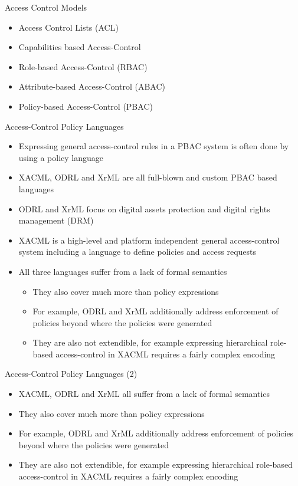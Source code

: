 \documentclass{beamer}
\begin{document}
\begin{frame}{Access Control Models}
\LARGE
\begin{itemize}
   \item Access Control Lists (ACL)
   \item Capabilities based Access-Control 
   \item Role-based Access-Control (RBAC)
   \item Attribute-based Access-Control (ABAC)
   \item Policy-based Access-Control (PBAC)
\end{itemize}
\end{frame}

\begin{frame}{Access-Control Policy Languages}
\begin{itemize}
   \item Expressing general access-control rules in a PBAC system is often done by using a policy language
   \item XACML, ODRL and XrML are all full-blown and custom PBAC based languages 
   \item ODRL and XrML focus on digital assets protection and digital rights management (DRM)
   \item XACML is a high-level and platform independent general access-control system including a language to define policies and access requests
   \item All three languages suffer from a lack of formal semantics
   \begin{itemize}
     \item They also cover much more than policy expressions
     \item For example, ODRL and XrML additionally address enforcement of policies beyond where the policies were generated
     \item They are also not extendible, for example expressing hierarchical role-based access-control in XACML requires a fairly complex encoding
   \end{itemize}
\end{itemize}
\end{frame}


\begin{frame}{Access-Control Policy Languages (2)}
\begin{itemize}
   \item XACML, ODRL and XrML all suffer from a lack of formal semantics
    \item They also cover much more than policy expressions     
    \item For example, ODRL and XrML additionally address enforcement of policies beyond where the policies were generated
     \item They are also not extendible, for example expressing hierarchical role-based access-control in XACML requires a fairly complex encoding
\end{itemize}
\end{frame}
\end{document}
